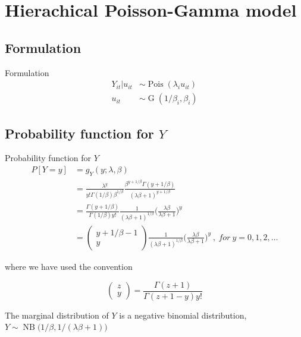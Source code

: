 \documentclass[aspectratio=169]{beamer}
\DeclareMathOperator{\G}{G}
\DeclareMathOperator{\NB}{NB}
\DeclareMathOperator{\Pois}{Pois}
\begin{document}
\hypertarget{hierachical-poisson-gamma-model}{%
\section{Hierachical Poisson-Gamma
model}\label{hierachical-poisson-gamma-model}}

\hypertarget{formulation-1}{%
\subsection{Formulation}\label{formulation-1}}

\begin{frame}{Formulation}
\begin{subequations} \label{eq:PoisGam}
  \begin{alignat}{2}
    Y_{it}|u_{it} &\sim \Pois (\lambda_{i} u_{it}) \label{eq:pois_g0} \\ 
    u_{it} &\sim \G(1/\beta_{i},\beta_{i}) \label{eq:pois_g1}
  \end{alignat}
\end{subequations}
\end{frame}

\hypertarget{probability-function-for-y}{%
\subsection{\texorpdfstring{Probability function for
\(Y\)}{Probability function for Y}}\label{probability-function-for-y}}

\begin{frame}{Probability function for \(Y\)}
\begin{equation} \label{eq:pdfMix}
  \begin{aligned}
    P[Y=y]&=g_{Y}(y;\lambda, \beta) \\
    &=\frac{\lambda^{y}}{y!\Gamma(1/\beta)\beta^{1/\beta}}\frac{\beta^{y+1/\beta}\Gamma(y+1/\beta)}{(\lambda \beta + 1)^{y+1/\beta}} \\
    &=\frac{\Gamma(y+1/\beta)}{\Gamma(1/\beta)y!}\frac{1}{(\lambda\beta+1)^{1/\beta}}\bigg(\frac{\lambda\beta}{\lambda\beta+1}\bigg)^{y} \\
    &=\begin{pmatrix} y+1/\beta-1 \\ y \end{pmatrix} \frac{1}{(\lambda\beta+1)^{1/\beta}}\bigg(\frac{\lambda\beta}{\lambda\beta+1}\bigg)^{y} \ , \ for \ y = 0, 1, 2, \dots
  \end{aligned}
\end{equation}

where we have used the convention

\begin{equation}
  \begin{pmatrix} z\\y \end{pmatrix} = \frac{\Gamma(z+1)}{\Gamma(z+1-y)y!}
\end{equation}

The marginal distribution of \(Y\) is a negative binomial distribution,
\(Y\sim \NB\big(1/\beta,1/(\lambda \beta+1)\big)\)
\end{frame}
\end{document}
